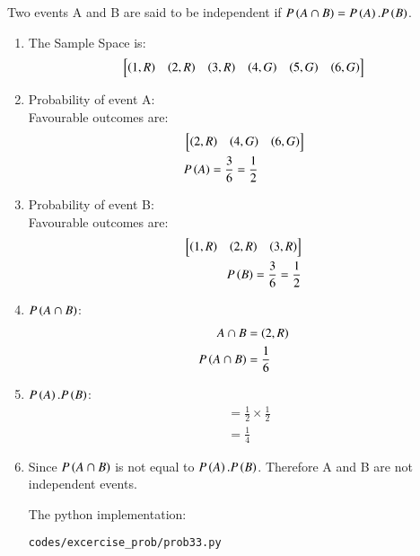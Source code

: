 \renewcommand{\theequation}{\theenumi}

\begin{theorem}
Two events A and B are said to be independent if $P\left(A \cap B\right) = P\left(A\right).P\left(B\right)$.
\end{theorem}


\begin{enumerate}

\item The Sample Space is:
\begin{align}
\begin{bmatrix}
\left(1, R\right) & \left(2, R\right) & \left(3, R\right) & \left(4, G\right) & \left(5, G\right) & \left(6, G\right) 
\end{bmatrix}
\end{align}

\item Probability of event A:\\
Favourable outcomes are:
\begin{align}
&\begin{bmatrix}
\left(2, R\right) & \left(4, G\right) & \left(6, G\right) 
\end{bmatrix}\\
&P\left(A\right) = \frac{3}{6} = \frac{1}{2}
\end{align}

\item Probability of event B:\\
Favourable outcomes are:
\begin{align}
\begin{bmatrix}
\left(1, R\right) & \left(2, R\right) & \left(3, R\right)  
\end{bmatrix}\\
P\left(B\right) = \frac{3}{6} = \frac{1}{2}
\end{align}

\item $P\left(A \cap B\right)$:
\begin{align}
A \cap B &= \left(2, R\right)\\   
P\left(A \cap B\right) &= \frac{1}{6} 
\end{align}

\item $P\left(A\right).P\left(B\right)$:
\begin{align}
&=\frac{1}{2} \times \frac{1}{2}\\
&= \frac{1}{4}
\end{align}

\item Since $P\left(A \cap B\right)$ is not equal to $P\left(A\right).P\left(B\right)$. Therefore A and B are not independent events.

The python implementation:
\begin{lstlisting}
codes/excercise_prob/prob33.py
\end{lstlisting}


\end{enumerate}
